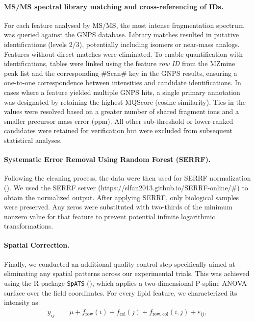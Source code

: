 \documentclass[9pt,twocolumn,twoside]{rilabRxiv}
\begin{document}
\paragraph{MS/MS spectral library matching and cross-referencing of IDs.}
For each feature analysed by MS/MS, the most intense fragmentation spectrum was queried against the GNPS database. Library matches resulted in putative identifications (levels 2/3), potentially including isomers or near-mass analogs. Features without direct matches were eliminated. To enable quantification with identifications, tables were linked using the feature \emph{row ID} from the MZmine peak list and the corresponding \#Scan\# key in the GNPS results, ensuring a one-to-one correspondence between intensities and candidate identifications. In cases where a feature yielded multiple GNPS hits, a single primary annotation was designated by retaining the highest MQScore (cosine similarity). Ties in the values were resolved based on a greater number of shared fragment ions and a smaller precursor mass error (ppm). All other sub-threshold or lower-ranked candidates were retained for verification but were excluded from subsequent statistical analyses.

\paragraph{Systematic Error Removal Using Random Forest (SERRF).}
Following the cleaning process, the data were then used for SERRF normalization (\cite{Fan2019}). We used the SERRF server (https://slfan2013.github.io/SERRF-online/\#) to obtain the normalized output. After applying SERRF, only biological samples were preserved. Any zeros were substituted with two-thirds of the minimum nonzero value for that feature to prevent potential infinite logarithmic transformations.

\paragraph{Spatial Correction.}
Finally, we conducted an additional quality control step specifically aimed at eliminating any spatial patterns across our experimental trials. This was achieved using the R package \texttt{SpATS} (\cite{RodriguezAlvarez2018}), which applies a two-dimensional P-spline ANOVA surface over the field coordinates. For every lipid feature, we characterized its intensity as
\begin{align}
  y_{ij} &= \mu + f_{\mathrm{row}}(i) + f_{\mathrm{col}}(j) + f_{\mathrm{row,col}}(i,j) + \varepsilon_{ij},
\end{align}
\end{document}
